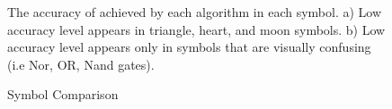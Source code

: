 \documentclass[preprint,10pt,5p,twocolumn]{elsarticle}
\begin{document}
\begin{figure} 
	\centering 
	\caption {Symbol Comparison} The accuracy of achieved by each algorithm in each symbol. a) Low accuracy level appears in triangle, heart, and moon symbols. b) Low accuracy level appears only in symbols that are visually confusing (i.e Nor, OR, Nand gates). 
\end{figure}  
\begin{table}
	\centering
 
	\caption{Confusion Matrix of Hs-DS}
	\label{tab:ConfusionMatrix}
\end{table}
\end{document}
